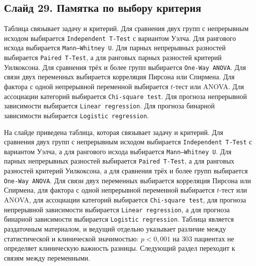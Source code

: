 \documentclass[11pt,a4paper]{article}
\begin{document}
\subsection*{Слайд 29. Памятка по выбору критерия}
\begin{onslide}
Таблица связывает задачу и критерий. Для сравнения двух групп с непрерывным исходом выбирается \texttt{Independent T-Test} с вариантом Уэлча. Для рангового исхода выбирается \texttt{Mann--Whitney U}. Для парных непрерывных разностей выбирается \texttt{Paired T-Test}, а для ранговых парных разностей критерий Уилкоксона. Для сравнения трёх и более групп выбирается \texttt{One-Way ANOVA}. Для связи двух переменных выбирается корреляция Пирсона или Спирмена. Для фактора с одной непрерывной переменной выбирается $t$-тест или ANOVA. Для ассоциации категорий выбирается \texttt{Chi-square test}. Для прогноза непрерывной зависимости выбирается \texttt{Linear regression}. Для прогноза бинарной зависимости выбирается \texttt{Logistic regression}.
\end{onslide}
На слайде приведена таблица, которая связывает задачу и критерий. Для сравнения двух групп с непрерывным исходом выбирается \texttt{Independent T-Test} с вариантом Уэлча, а для рангового исхода выбирается \texttt{Mann--Whitney U}. Для парных непрерывных разностей выбирается \texttt{Paired T-Test}, а для ранговых разностей критерий Уилкоксона, а для сравнения трёх и более групп выбирается \texttt{One-Way ANOVA}. Для связи двух переменных выбирается корреляция Пирсона или Спирмена, для фактора с одной непрерывной переменной выбирается $t$-тест или ANOVA, для ассоциации категорий выбирается \texttt{Chi-square test}, для прогноза непрерывной зависимости выбирается \texttt{Linear regression}, а для прогноза бинарной зависимости выбирается \texttt{Logistic regression}. Таблица является раздаточным материалом, и ведущий отдельно указывает различие между статистической и клинической значимостью: $p < 0{,}001$ на 303 пациентах не определяет клиническую важность разницы. Следующий раздел переходит к связям между переменными.
\end{document}
